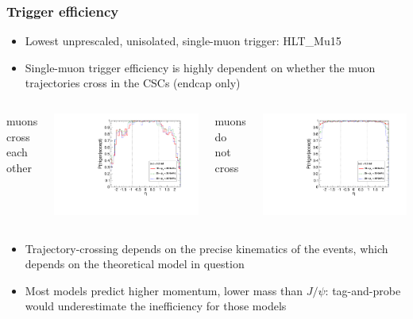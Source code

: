 \documentclass[compress]{beamer}
\begin{document}
\begin{frame}
\frametitle{Trigger efficiency}

\begin{itemize}
\item Lowest unprescaled, unisolated, single-muon trigger: HLT\_Mu15
\item Single-muon trigger efficiency is highly dependent on whether the
  muon trajectories cross in the CSCs (endcap only)
\end{itemize}

\begin{columns}
\centering muons cross each other

\includegraphics[width=\linewidth]{efficiency_trigger.pdf}

\centering muons do not cross

\includegraphics[width=\linewidth]{efficiency_trigger_anticut.pdf}
\end{columns}

\begin{itemize}
\item Trajectory-crossing depends on the precise kinematics of the
  events, which depends on the theoretical model in question
\item Most models predict higher momentum, lower mass than $J/\psi$:
  tag-and-probe would underestimate the inefficiency for those models
\end{itemize}
\end{frame}
\end{document}
